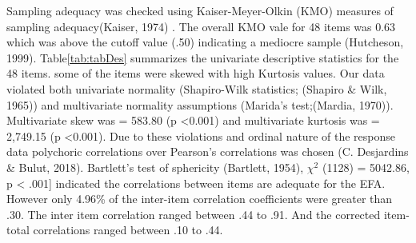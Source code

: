 \documentclass[
  english,
  man]{apa6}
\begin{document}
Sampling adequacy was checked using Kaiser-Meyer-Olkin (KMO) measures of sampling adequacy(Kaiser, 1974) . The overall KMO vale for 48 items was 0.63 which was above the cutoff value (.50) indicating a mediocre sample (Hutcheson, 1999). Table\ref{tab:tabDes} summarizes the univariate descriptive statistics for the 48 items. some of the items were skewed with high Kurtosis values. Our data violated both univariate normality (Shapiro-Wilk statistics; (Shapiro \& Wilk, 1965)) and multivariate normality assumptions (Marida's test;(Mardia, 1970)). Multivariate skew was = 583.80 (p \textless0.001) and multivariate kurtosis was = 2,749.15 (p \textless0.001). Due to these violations and ordinal nature of the response data polychoric correlations over Pearson's correlations was chosen (C. Desjardins \& Bulut, 2018). Bartlett's test of sphericity (Bartlett, 1954), \(\chi^2\) (1128) = 5042.86, p \textless{} .001{]} indicated the correlations between items are adequate for the EFA. However only 4.96\% of the inter-item correlation coefficients were greater than .30. The inter item correlation ranged between .44 to .91. And the corrected item-total correlations ranged between .10 to .44.
\end{document}
